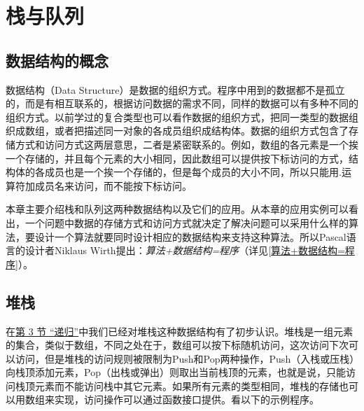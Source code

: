 

\chapter{栈与队列}
%





\section{数据结构的概念}
%
数据结构（Data Structure）是数据的组织方式。程序中用到的数据都不是孤立的，而是有相互联系的，根据访问数据的需求不同，同样的数据可以有多种不同的组织方式。以前学过的复合类型也可以看作数据的组织方式，把同一类型的数据组织成数组，或者把描述同一对象的各成员组织成结构体。数据的组织方式包含了存储方式和访问方式这两层意思，二者是紧密联系的。例如，数组的各元素是一个挨一个存储的，并且每个元素的大小相同，因此数组可以提供按下标访问的方式，结构体的各成员也是一个挨一个存储的，但是每个成员的大小不同，所以只能用.运算符加成员名来访问，而不能按下标访问。



本章主要介绍栈和队列这两种数据结构以及它们的应用。从本章的应用实例可以看出，一个问题中数据的存储方式和访问方式就决定了解决问题可以采用什么样的算法，要设计一个算法就要同时设计相应的数据结构来支持这种算法。所以Pascal语言的设计者Niklaus Wirth提出：\emph{算法+数据结构=程序}（详见\hyperlink{db.bi01.bibli.wirth}{[算法+数据结构=程序]}）。




\section{堆栈}
%
在\hyperlink{db.ch05s03.id2722951}{第 3 节 “递归”}中我们已经对堆栈这种数据结构有了初步认识。堆栈是一组元素的集合，类似于数组，不同之处在于，数组可以按下标随机访问，这次访问下次可以访问，但是堆栈的访问规则被限制为Push和Pop两种操作，Push（入栈或压栈）向栈顶添加元素，Pop（出栈或弹出）则取出当前栈顶的元素，也就是说，只能访问栈顶元素而不能访问栈中其它元素。如果所有元素的类型相同，堆栈的存储也可以用数组来实现，访问操作可以通过函数接口提供。看以下的示例程序。


